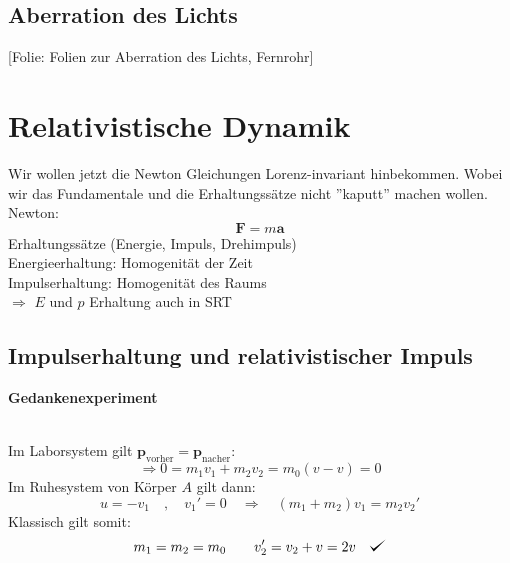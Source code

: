 \documentclass[titlepage,11pt,a4paper,ngerman]{report}
\def\checkmark{\tikz\fill[scale=0.4](0,.35) -- (.25,0) -- (1,.7) -- (.25,.15) -- cycle;}
\newcommand{\tx}[1]{\textrm{#1}}
\newcommand{\folie}[1]{\color{gray}[Folie: #1]\color{black}}
\renewcommand{\vec}[1]{\boldsymbol{#1}}
\newcommand{\lcom}[1]{\color{MidnightBlue}#1\color{black}}
\begin{document}
\subsection{Aberration des Lichts}

\folie{Folien zur Aberration des Lichts, Fernrohr}

\section{Relativistische Dynamik}
\lcom{Wir wollen jetzt die Newton Gleichungen Lorenz-invariant hinbekommen. Wobei wir das Fundamentale und die Erhaltungssätze nicht ''kaputt'' machen wollen.}\\
Newton: \begin{equation*}
\vec{F} = m \vec{a}
\end{equation*}
Erhaltungssätze (Energie, Impuls, Drehimpuls)\\[5pt]
Energieerhaltung: Homogenität der Zeit\\
Impulserhaltung: Homogenität des Raums\\[5pt]
$ \Rightarrow $ $ E $ und $ p $ Erhaltung auch in SRT

\subsection{Impulserhaltung und relativistischer Impuls}
\textbf{Gedankenexperiment}\\[5pt]
\\
Im Laborsystem gilt $ \vec{p}_{\tx{vorher}} = \vec{p}_{\tx{nacher}} $:
\begin{equation*}
\Rightarrow 0 = m_1 v_1 + m_2 v_2 = m_0 (v-v) = 0
\end{equation*}
Im Ruhesystem von Körper $ A $ gilt dann:
\begin{equation*}
u = - v_1 \quad , \quad v_1' = 0
\quad
\Rightarrow \quad (m_1 + m_2) v_1 = m_2 v_2'
\end{equation*}
Klassisch gilt somit:
\begin{equation*}
m_1 = m_2 = m_0
\qquad
v_2' = v_2 + v = 2v \quad \checkmark
\end{equation*}
\end{document}
